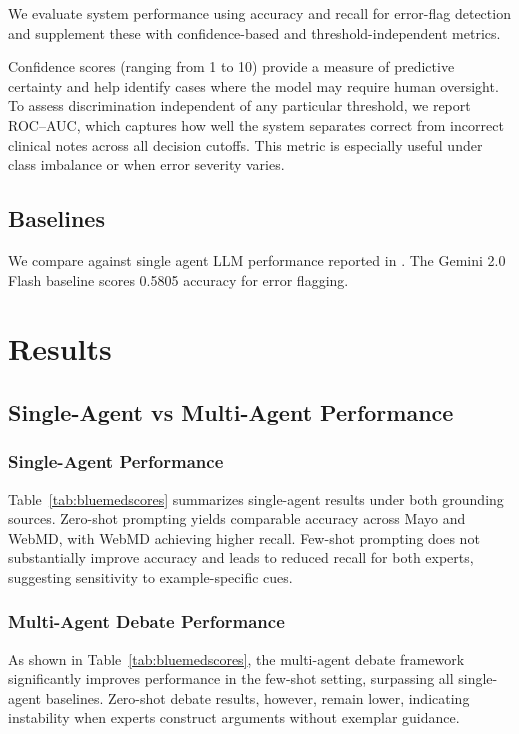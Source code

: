 \documentclass[11pt]{article}
\begin{document}
We evaluate system performance using accuracy and recall for error-flag detection and supplement these with confidence-based and threshold-independent metrics.  

Confidence scores (ranging from 1 to 10) provide a measure of predictive certainty and help identify cases where the model may require human oversight. To assess discrimination independent of any particular threshold, we report ROC–AUC, which captures how well the system separates correct from incorrect clinical notes across all decision cutoffs. This metric is especially useful under class imbalance or when error severity varies.

\subsection{Baselines}

We compare against single agent LLM performance reported in \citet{benabacha2024medec}. The Gemini 2.0 Flash baseline scores 0.5805 accuracy for error flagging.

\section{Results}

\subsection{Single-Agent vs Multi-Agent Performance}
\subsubsection{Single-Agent Performance}
Table~\ref{tab:bluemedscores} summarizes single-agent results under both grounding sources. 
Zero-shot prompting yields comparable accuracy across Mayo and WebMD, with WebMD achieving higher recall. 
Few-shot prompting does not substantially improve accuracy and leads to reduced recall for both experts, suggesting sensitivity to example-specific cues.

\subsubsection{Multi-Agent Debate Performance}
As shown in Table~\ref{tab:bluemedscores}, the multi-agent debate framework significantly improves performance in the few-shot setting, surpassing all single-agent baselines. 
Zero-shot debate results, however, remain lower, indicating instability when experts construct arguments without exemplar guidance.
\end{document}
